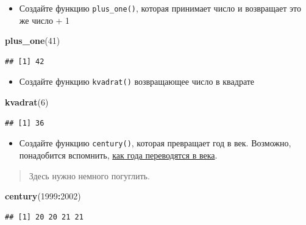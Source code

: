 \documentclass[]{book}
\newenvironment{Shaded}{\begin{snugshade}}{\end{snugshade}}
\newcommand{\KeywordTok}[1]{\textcolor[rgb]{0.13,0.29,0.53}{\textbf{#1}}}
\newcommand{\DecValTok}[1]{\textcolor[rgb]{0.00,0.00,0.81}{#1}}
\newcommand{\OperatorTok}[1]{\textcolor[rgb]{0.81,0.36,0.00}{\textbf{#1}}}
\newcommand{\NormalTok}[1]{#1}
\providecommand{\tightlist}{%
  \setlength{\itemsep}{0pt}\setlength{\parskip}{0pt}}
\begin{document}
\begin{itemize}
\tightlist
\item
  Создайте функцию \texttt{plus\_one()}, которая принимает число и
  возвращает это же число + 1
\end{itemize}

\begin{Shaded}
\begin{Highlighting}[]
\KeywordTok{plus_one}\NormalTok{(}\DecValTok{41}\NormalTok{)}
\end{Highlighting}
\end{Shaded}

\begin{verbatim}
## [1] 42
\end{verbatim}

\begin{itemize}
\tightlist
\item
  Создайте функцию \texttt{kvadrat()} возвращающее число в квадрате
\end{itemize}

\begin{Shaded}
\begin{Highlighting}[]
\KeywordTok{kvadrat}\NormalTok{(}\DecValTok{6}\NormalTok{)}
\end{Highlighting}
\end{Shaded}

\begin{verbatim}
## [1] 36
\end{verbatim}

\begin{itemize}
\tightlist
\item
  Создайте функцию \texttt{century()}, которая превращает год в век.
  Возможно, понадобится вспомнить,
  \href{https://ru.wikipedia.org/wiki/Век}{как года переводятся в века}.
\end{itemize}

\begin{quote}
Здесь нужно немного погуглить.
\end{quote}

\begin{Shaded}
\begin{Highlighting}[]
\KeywordTok{century}\NormalTok{(}\DecValTok{1999}\OperatorTok{:}\DecValTok{2002}\NormalTok{)}
\end{Highlighting}
\end{Shaded}

\begin{verbatim}
## [1] 20 20 21 21
\end{verbatim}
\end{document}
